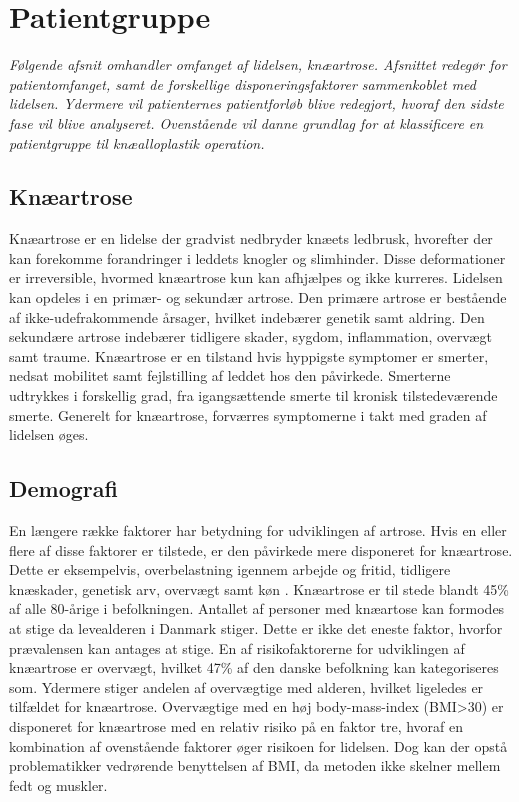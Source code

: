 \section{Patientgruppe}
\textit{Følgende afsnit omhandler omfanget af lidelsen, knæartrose. Afsnittet redegør for patientomfanget, samt de forskellige disponeringsfaktorer sammenkoblet med lidelsen. Ydermere vil patienternes patientforløb blive redegjort, hvoraf den sidste fase vil blive analyseret. Ovenstående vil danne grundlag for at klassificere en patientgruppe til knæalloplastik operation.}
\subsection*{Knæartrose}
Knæartrose er en lidelse der gradvist nedbryder knæets ledbrusk, hvorefter der kan forekomme forandringer i leddets knogler og slimhinder. Disse deformationer er irreversible, hvormed knæartrose kun kan afhjælpes og ikke kurreres. Lidelsen kan opdeles i en primær- og sekundær artrose. Den primære artrose er bestående af ikke-udefrakommende årsager, hvilket indebærer genetik samt aldring. Den sekundære artrose indebærer tidligere skader, sygdom, inflammation, overvægt samt traume. Knæartrose er en tilstand hvis hyppigste symptomer er smerter, nedsat mobilitet samt fejlstilling af leddet hos den påvirkede. Smerterne udtrykkes i forskellig grad, fra igangsættende smerte til kronisk tilstedeværende smerte. Generelt for knæartrose, forværres symptomerne i takt med graden af lidelsen øges. \citep{Lind2016b}
\subsection*{Demografi}
En længere række faktorer har betydning for udviklingen af artrose. Hvis en eller flere af disse faktorer er tilstede, er den påvirkede mere disponeret for knæartrose. Dette er eksempelvis, overbelastning igennem arbejde og fritid, tidligere knæskader, genetisk arv, overvægt samt køn \citep{brostrom2012}. Knæartrose er til stede blandt 45\% af alle 80-årige i befolkningen. Antallet af personer med knæartose kan formodes at stige da levealderen i Danmark stiger. Dette er ikke det eneste faktor, hvorfor prævalensen kan antages at stige. En af risikofaktorerne for udviklingen af knæartrose er overvægt, hvilket 47\% af den danske befolkning kan kategoriseres som. Ydermere stiger andelen af overvægtige med alderen, hvilket ligeledes er tilfældet for knæartrose. Overvægtige med en høj body-mass-index (BMI>30\citep{definitionfedme1999}) er disponeret for knæartrose med en relativ risiko på en faktor tre, hvoraf en kombination af ovenstående faktorer øger risikoen for lidelsen. Dog kan der opstå problematikker vedrørende benyttelsen af BMI, da metoden ikke skelner mellem fedt og muskler. \citep{brostrom2012} \citep{Vestergaard2014} \citep{Vestergaard2016} \citep{Lind2016} \citep{Lind2016b}

